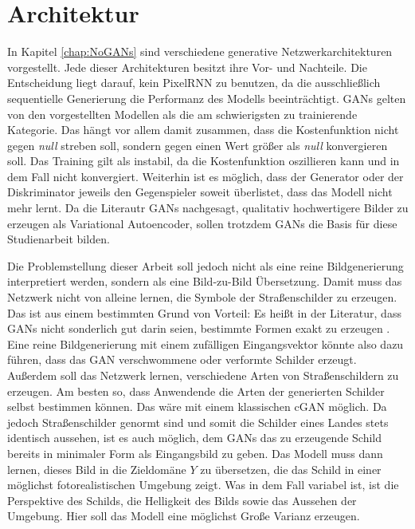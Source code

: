 \section{Architektur}
\label{chap:3-architektur}
In Kapitel \ref{chap:NoGANs} sind verschiedene generative Netzwerkarchitekturen vorgestellt. Jede dieser Architekturen besitzt ihre Vor- und Nachteile. Die Entscheidung liegt darauf, kein \ac{PixelRNN} zu benutzen, da die ausschließlich sequentielle Generierung die Performanz des Modells beeinträchtigt. \acp{GAN} gelten von den vorgestellten Modellen als die am schwierigsten zu trainierende Kategorie. Das hängt vor allem damit zusammen, dass die Kostenfunktion nicht gegen \emph{null} streben soll, sondern gegen einen Wert größer als \emph{null} konvergieren soll. Das Training gilt als instabil, da die Kostenfunktion oszillieren kann und in dem Fall nicht konvergiert. Weiterhin ist es möglich, dass der Generator oder der Diskriminator jeweils den Gegenspieler soweit überlistet, dass das Modell nicht mehr lernt. Da die Literautr \acp{GAN} nachgesagt, qualitativ hochwertigere Bilder zu erzeugen als Variational Autoencoder, sollen trotzdem \acp{GAN} die Basis für diese Studienarbeit bilden. \cite{generativeModelsSurvey} \cite{generative-models-comparison}

Die Problemstellung dieser Arbeit soll jedoch nicht als eine reine Bildgenerierung interpretiert werden, sondern als eine Bild-zu-Bild Übersetzung. Damit muss das Netzwerk nicht von alleine lernen, die Symbole der Straßenschilder zu erzeugen. Das ist aus einem bestimmten Grund von Vorteil: Es heißt in der Literatur, dass \acp{GAN} nicht sonderlich gut darin seien, bestimmte Formen exakt zu erzeugen \cite{generativeModelsSurvey}. Eine reine Bildgenerierung mit einem zufälligen Eingangsvektor könnte also dazu führen, dass das \ac{GAN} verschwommene oder verformte Schilder erzeugt. Außerdem soll das Netzwerk lernen, verschiedene Arten von Straßenschildern zu erzeugen. Am besten so, dass Anwendende die Arten der generierten Schilder selbst bestimmen können. Das wäre mit einem klassischen \ac{cGAN} möglich. Da jedoch Straßenschilder genormt sind und somit die Schilder eines Landes stets identisch aussehen, ist es auch möglich, dem \acp{GAN} das zu erzeugende Schild bereits in minimaler Form als Eingangsbild zu geben. Das Modell muss dann lernen, dieses Bild in die Zieldomäne $Y$ zu übersetzen, die das Schild in einer möglichst fotorealistischen Umgebung zeigt. Was in dem Fall variabel ist, ist die Perspektive des Schilds, die Helligkeit des Bilds sowie das Aussehen der Umgebung. Hier soll das Modell eine möglichst Große Varianz erzeugen.

